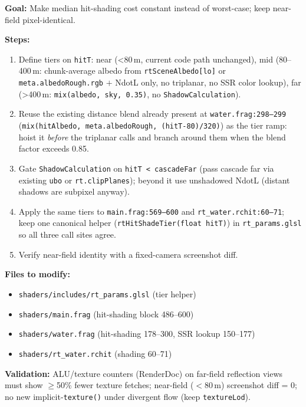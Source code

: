 \documentclass[11pt,a4paper]{article}
\begin{document}
\begin{tcolorbox}[promptbox={Prompt: Distance-Tiered Reflection Hit Shading}]
\textbf{Goal:} Make median hit-shading cost constant instead of worst-case; keep near-field pixel-identical.

\textbf{Steps:}
\begin{enumerate}
    \item Define tiers on \texttt{hitT}: near (\textless{}80\,m, current code path unchanged), mid (80--400\,m: chunk-average albedo from \texttt{rtSceneAlbedo[lo]} or \texttt{meta.albedoRough.rgb} $+$ NdotL only, no triplanar, no SSR color lookup), far (\textgreater{}400\,m: \texttt{mix(albedo, sky, 0.35)}, no \texttt{ShadowCalculation}).
    \item Reuse the existing distance blend already present at \texttt{water.frag:298--299} (\texttt{mix(hitAlbedo, meta.albedoRough, (hitT-80)/320)}) as the tier ramp: hoist it \textit{before} the triplanar calls and branch around them when the blend factor exceeds 0.85.
    \item Gate \texttt{ShadowCalculation} on \texttt{hitT \textless{} cascadeFar} (pass cascade far via existing \texttt{ubo} or \texttt{rt.clipPlanes}); beyond it use unshadowed NdotL (distant shadows are subpixel anyway).
    \item Apply the same tiers to \texttt{main.frag:569--600} and \texttt{rt\_water.rchit:60--71}; keep one canonical helper (\texttt{rtHitShadeTier(float hitT)}) in \texttt{rt\_params.glsl} so all three call sites agree.
    \item Verify near-field identity with a fixed-camera screenshot diff.
\end{enumerate}

\textbf{Files to modify:}
\begin{itemize}
    \item \texttt{shaders/includes/rt\_params.glsl} (tier helper)
    \item \texttt{shaders/main.frag} (hit-shading block 486--600)
    \item \texttt{shaders/water.frag} (hit-shading 178--300, SSR lookup 150--177)
    \item \texttt{shaders/rt\_water.rchit} (shading 60--71)
\end{itemize}

\textbf{Validation:} ALU/texture counters (RenderDoc) on far-field reflection views must show $\geq$50\% fewer texture fetches; near-field ($<$80\,m) screenshot diff = 0; no new implicit-\texttt{texture()} under divergent flow (keep \texttt{textureLod}).
\end{tcolorbox}
\end{document}
